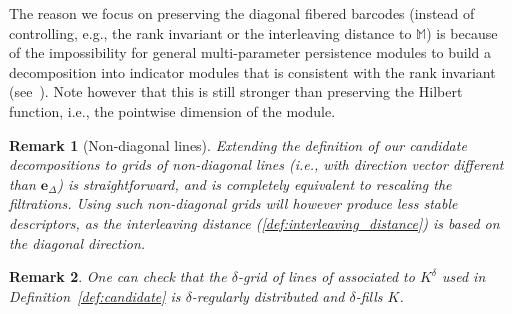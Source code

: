 \documentclass{article}
\newcommand{\Mbb}{\mathbb{M}}
\newcommand{\mmaout}{candidate}
\newtheorem{remark}{Remark}%
\newcommand{\rebuttal}[1]{{ #1}}
\begin{document}
\rebuttal{The reason we focus on preserving the diagonal fibered barcodes (instead of controlling, e.g., the rank invariant or the interleaving distance to $\Mbb$) is because of the impossibility for general multi-parameter persistence modules to build a decomposition into indicator modules that is consistent with the rank invariant (see~\cite[Section 10.2.3]{lesnickNotesMultiparameterPersistence2023}). Note however that this is still stronger than preserving the Hilbert function, i.e., the pointwise dimension of the module.} \\

\rebuttal{
	\begin{remark}[Non-diagonal lines]
		Extending the definition of our \mmaout{} decompositions to grids of non-diagonal lines (i.e., with direction vector different than $\boldsymbol{e}_\Delta$) is straightforward, and is completely equivalent to rescaling %
		the filtrations.
		Using such non-diagonal grids will however produce less stable descriptors, as the interleaving distance (\cref{def:interleaving_distance}) is based on the diagonal direction. \\
	\end{remark}
}


\begin{remark}\label{rmk:grid}
	One can check that the $\delta$-grid of lines of associated to $K^\delta$ used in
	Definition~\ref{def:candidate}
	is $\delta$-regularly distributed and $\delta$-fills $K$. \\
\end{remark}
\end{document}
